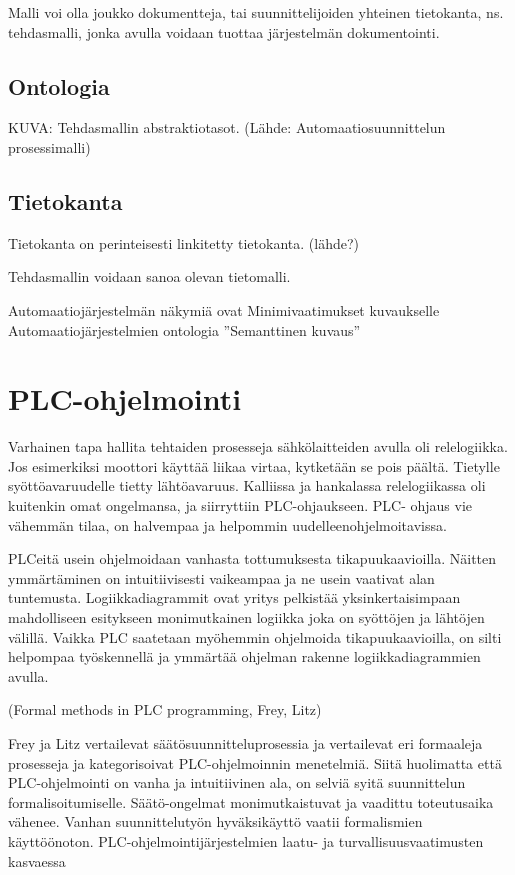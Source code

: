 \documentclass[finnish,12pt]{article}
\begin{document}
Malli voi olla joukko dokumentteja, tai suunnittelijoiden yhteinen tietokanta, ns. tehdasmalli, jonka avulla voidaan tuottaa järjestelmän dokumentointi.

		\subsection{Ontologia}



KUVA: Tehdasmallin abstraktiotasot. (Lähde: Automaatiosuunnittelun prosessimalli)

		\subsection{Tietokanta}

Tietokanta on perinteisesti linkitetty tietokanta. (lähde?)

Tehdasmallin voidaan sanoa olevan tietomalli.

Automaatiojärjestelmän näkymiä ovat
Minimivaatimukset kuvaukselle
Automaatiojärjestelmien ontologia
”Semanttinen kuvaus”

	\clearpage
	\section{PLC-ohjelmointi}

Varhainen tapa hallita tehtaiden prosesseja sähkölaitteiden avulla oli relelogiikka.
Jos esimerkiksi moottori käyttää liikaa virtaa, kytketään se pois päältä.
Tietylle syöttöavaruudelle tietty lähtöavaruus.
Kalliissa ja hankalassa relelogiikassa oli kuitenkin omat ongelmansa, ja siirryttiin PLC-ohjaukseen.
PLC- ohjaus vie vähemmän tilaa, on halvempaa ja helpommin uudelleenohjelmoitavissa.

PLCeitä usein ohjelmoidaan vanhasta tottumuksesta tikapuukaavioilla.
Näitten ymmärtäminen on intuitiivisesti vaikeampaa ja ne usein vaativat alan tuntemusta.
Logiikkadiagrammit ovat yritys pelkistää yksinkertaisimpaan mahdolliseen esitykseen monimutkainen logiikka joka on syöttöjen ja lähtöjen välillä.
Vaikka PLC saatetaan myöhemmin ohjelmoida tikapuukaavioilla, on silti helpompaa työskennellä ja ymmärtää ohjelman rakenne logiikkadiagrammien avulla.



(Formal methods in PLC programming, Frey, Litz)

Frey ja Litz vertailevat säätösuunnitteluprosessia ja vertailevat eri formaaleja prosesseja ja kategorisoivat PLC-ohjelmoinnin menetelmiä. 
Siitä huolimatta että PLC-ohjelmointi on vanha ja intuitiivinen ala, on selviä syitä suunnittelun formalisoitumiselle.
Säätö-ongelmat monimutkaistuvat ja vaadittu toteutusaika vähenee.
Vanhan suunnittelutyön hyväksikäyttö vaatii formalismien käyttöönoton.
PLC-ohjelmointijärjestelmien laatu- ja turvallisuusvaatimusten kasvaessa 
\end{document}
